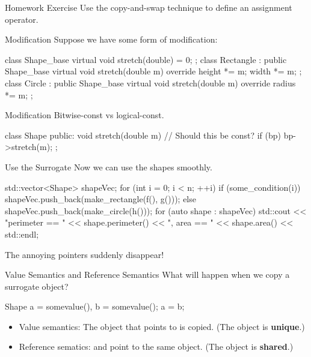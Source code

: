 \documentclass{beamer}
\begin{document}
\begin{frame}{Homework Exercise}
    Use the copy-and-swap technique to define an assignment operator.
\end{frame}

\begin{frame}[fragile]{Modification}
    Suppose we have some form of modification:
    \begin{cpp}
class Shape_base {
  virtual void stretch(double) = 0;
};
class Rectangle : public Shape_base {
  virtual void stretch(double m) override {
    height *= m; width *= m;
  }
};
class Circle : public Shape_base {
  virtual void stretch(double m) override {
    radius *= m;
  }
};
    \end{cpp}
\end{frame}

\begin{frame}[fragile]{Modification}
    Bitwise-const vs logical-const.
    \begin{cpp}
class Shape {
 public:
  void stretch(double m) { // Should this be const?
    if (bp)
      bp->stretch(m);
  }
};
    \end{cpp}
\end{frame}

\begin{frame}[fragile]{Use the Surrogate}
    Now we can use the shapes smoothly.
    \begin{cpp}
std::vector<Shape> shapeVec;
for (int i = 0; i < n; ++i) {
  if (some_condition(i))
    shapeVec.push_back(make_rectangle(f(), g()));
  else
    shapeVec.push_back(make_circle(h()));
}
for (auto shape : shapeVec) {
  std::cout << "perimeter == " << shape.perimeter()
            << ", area == " << shape.area() << std::endl;
}
    \end{cpp}
    The annoying pointers suddenly disappear!
\end{frame}

\begin{frame}[fragile]{Value Semantics and Reference Semantics}
    What will happen when we copy a surrogate object?
    \begin{cpp}
Shape a = somevalue(), b = somevalue();
a = b;
    \end{cpp}
    \begin{itemize}
        \item Value semantics: The object that  points to is copied. (The object is \textbf{unique}.)
        \item Reference sematics:  and  point to the same object. (The object is \textbf{shared}.)
    \end{itemize}
\end{frame}
\end{document}
